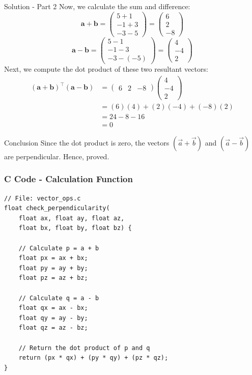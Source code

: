 \documentclass{beamer}
\begin{document}
\begin{frame}{Solution - Part 2}
Now, we calculate the sum and difference:
\begin{equation}
\mathbf{a} + \mathbf{b} = \begin{pmatrix} 5+1 \\ -1+3 \\ -3-5 \end{pmatrix} = \begin{pmatrix} 6 \\ 2 \\ -8 \end{pmatrix}
\end{equation}
\begin{equation}
\mathbf{a} - \mathbf{b} = \begin{pmatrix} 5-1 \\ -1-3 \\ -3-(-5) \end{pmatrix} = \begin{pmatrix} 4 \\ -4 \\ 2 \end{pmatrix}
\end{equation}
Next, we compute the dot product of these two resultant vectors:
\begin{align}
(\mathbf{a} + \mathbf{b})^\top (\mathbf{a} - \mathbf{b}) &= \begin{pmatrix} 6 & 2 & -8 \end{pmatrix} \begin{pmatrix} 4 \\ -4 \\ 2 \end{pmatrix} \nonumber \\
&= (6)(4) + (2)(-4) + (-8)(2) \nonumber \\
&= 24 - 8 - 16 \nonumber \\
&= 0
\end{align}
\end{frame}

\begin{frame}{Conclusion}
Since the dot product is zero, the vectors $(\vec{a} + \vec{b})$ and $(\vec{a} - \vec{b})$ are perpendicular. Hence, proved.
\end{frame}


\begin{frame}[fragile]
    \frametitle{C Code - Calculation Function}
    \lstset{language=C}
    \begin{lstlisting}
// File: vector_ops.c
float check_perpendicularity(
    float ax, float ay, float az, 
    float bx, float by, float bz) {
    
    // Calculate p = a + b
    float px = ax + bx;
    float py = ay + by;
    float pz = az + bz;

    // Calculate q = a - b
    float qx = ax - bx;
    float qy = ay - by;
    float qz = az - bz;

    // Return the dot product of p and q
    return (px * qx) + (py * qy) + (pz * qz);
}
    \end{lstlisting}
\end{frame}
\end{document}
